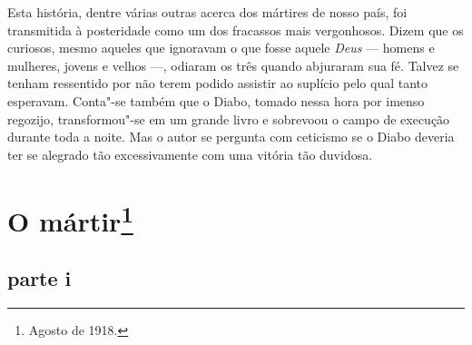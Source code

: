 Esta história, dentre várias outras acerca dos mártires de nosso país,
foi transmitida à posteridade como um dos fracassos mais vergonhosos.
Dizem que os curiosos, mesmo aqueles que ignoravam o que fosse aquele
\textit{Deus} --- homens e mulheres, jovens e velhos ---, odiaram os três quando 
abjuraram sua fé. Talvez se tenham ressentido por não terem podido
assistir ao suplício pelo qual tanto esperavam. Conta"-se também que o
Diabo, tomado nessa hora por imenso regozijo, transformou"-se em um
grande livro e sobrevoou o campo de execução durante toda a noite. Mas
o autor se pergunta com ceticismo se o Diabo deveria ter se alegrado
tão excessivamente com uma vitória tão duvidosa.

\chapter{O mártir\footnote{Agosto de 1918.}}

\setlength{\epigraphwidth}{.60\textwidth}
\begin{epigraphs} 

\bigskip

\end{epigraphs}

\section*{parte i}

